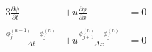 \documentclass{article}
\begin{document}
\begin{alignat*}{3}
\frac{\partial \phi}{\partial t} &+ u \frac{\partial \phi}{\partial x} &= 0 \\
\\
\frac{\phi^{(n+1)}_j - \phi^{(n)}_j}{\Delta t} &+ u \frac{\phi^{(n)}_{j+1} - \phi^{(n)}_{j}}{\Delta x} &= 0
\end{alignat*}
\end{document}
